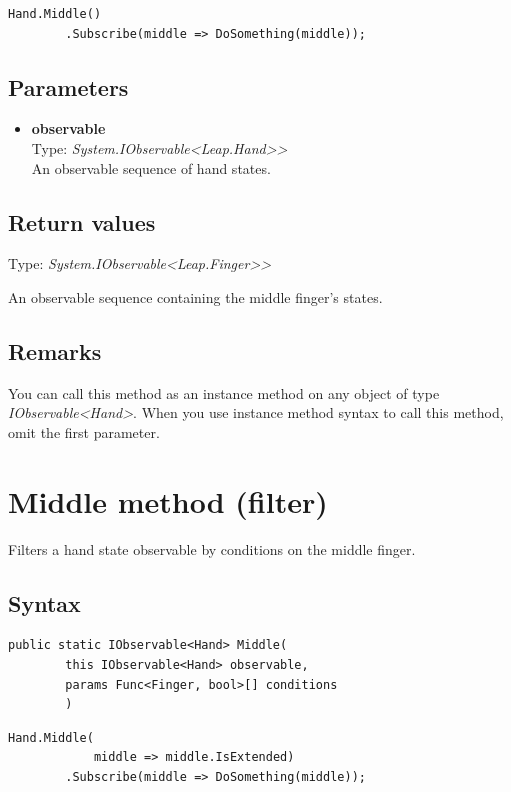 \documentclass[12pt,a4paper,twoside]{report}
\begin{document}
\begin{lstlisting}[caption=Usage example]
    Hand.Middle()
        .Subscribe(middle => DoSomething(middle));
\end{lstlisting}

\subsection{Parameters}
\begin{itemize}
    \item \textbf{observable}\\
    Type: \textit{System.IObservable<Leap.Hand>{}>}\\
    An observable sequence of hand states.
\end{itemize}

\subsection{Return values}
Type: \textit{System.IObservable<Leap.Finger>{}>}

An observable sequence containing the middle finger's states.

\subsection{Remarks}
You can call this method as an instance method on any object of type \textit{IObservable<Hand>}. When you use 
instance method syntax to call this method, omit the first parameter.

\newpage

\section{Middle method (filter)}
Filters a hand state observable by conditions on the middle finger.

\subsection{Syntax}
\begin{lstlisting}[caption=Declaration]
    public static IObservable<Hand> Middle(
        this IObservable<Hand> observable,
        params Func<Finger, bool>[] conditions
        )
\end{lstlisting}

\begin{lstlisting}[caption=Usage example]
    Hand.Middle(
            middle => middle.IsExtended)
        .Subscribe(middle => DoSomething(middle));
\end{lstlisting}
\end{document}
